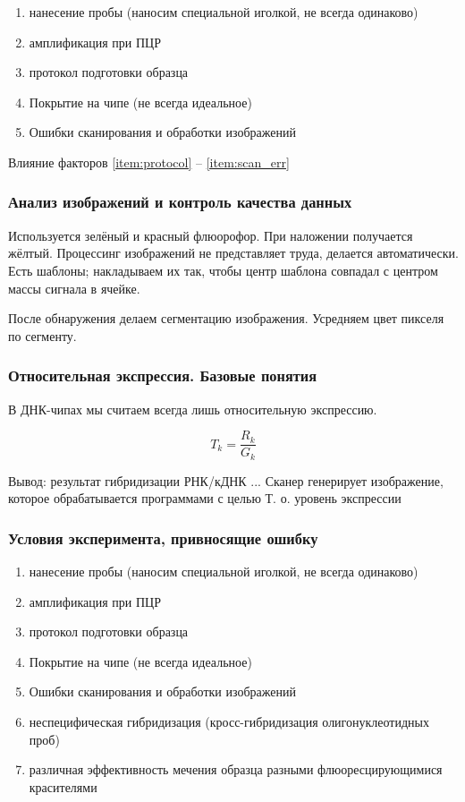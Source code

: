 \documentclass[main.tex]{subfiles}
\begin{document}
\begin{enumerate}[noitemsep]
    \item нанесение пробы (наносим специальной иголкой, не всегда одинаково)
    \item амплификация при ПЦР
    \item протокол подготовки образца \label{item:protocol}
    \item Покрытие на чипе (не всегда идеальное)
    \item Ошибки сканирования и обработки изображений \label{item:scan_err}
\end{enumerate}

Влияние факторов \ref{item:protocol} -- \ref{item:scan_err} %

\subsubsection{Анализ изображений и контроль качества данных}

Используется зелёный и красный флюорофор.
При наложении получается жёлтый.
Процессинг изображений не представляет труда, делается автоматически.
Есть шаблоны; накладываем их так, чтобы центр шаблона совпадал с центром массы сигнала в ячейке. %

После обнаружения делаем сегментацию изображения. Усредняем цвет пикселя по сегменту.

\subsubsection{Относительная экспрессия. Базовые понятия}

В ДНК-чипах мы считаем всегда лишь относительную экспрессию.

$$ T_k = \frac{R_k}{G_k} $$


Вывод: результат гибридизации РНК/кДНК ... %
Сканер генерирует изображение, которое обрабатывается программами с целью %
Т. о. уровень экспрессии

\subsubsection{Условия эксперимента, привносящие ошибку}
\begin{enumerate}[noitemsep]
    \item нанесение пробы (наносим специальной иголкой, не всегда одинаково)
    \item амплификация при ПЦР
    \item протокол подготовки образца
    \item Покрытие на чипе (не всегда идеальное)
    \item Ошибки сканирования и обработки изображений
    \item неспецифическая гибридизация (кросс-гибридизация олигонуклеотидных проб)
    \item различная эффективность мечения образца разными флюоресцирующимися красителями
\end{enumerate}
\end{document}
